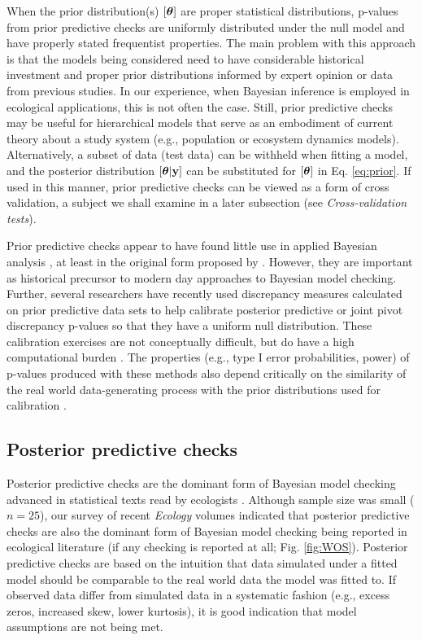 \documentclass[12pt,english]{article}
\begin{document}
\begin{spacing}{1.9}
When the prior distribution(s) $[\boldsymbol{\theta}]$ are proper statistical
distributions, p-values from prior predictive checks are uniformly
distributed under the null model and have properly stated frequentist
properties.  The main problem with this approach is that the models
being considered need to have considerable historical investment and
proper prior distributions informed by expert opinion or data from
previous studies.  In our experience, when Bayesian inference is
employed in ecological applications, this is not often the case.
Still, prior predictive checks may be useful for hierarchical models
that serve as an embodiment of current theory about a study system
(e.g., population or ecosystem dynamics models).  Alternatively, a
subset of data (test data) can be withheld when fitting a model, and
the posterior distribution $[\boldsymbol{\theta}|{\bf y}]$ can be substituted for
$[\boldsymbol{\theta}]$ in Eq. \ref{eq:prior}.  If used in this manner, prior
predictive checks can be viewed as a form of cross validation, a
subject we shall examine in a later subsection (see
\textit{Cross-validation tests}).

Prior predictive checks appear to have found little use in applied
Bayesian analysis \citep[but see][]{DeyEtAl1998}, at least in the
original form proposed by \citet{Box1980}. However, they are important
as historical precursor to modern day approaches to Bayesian model
checking. Further, several researchers have recently used discrepancy
measures calculated on prior predictive data sets to help calibrate
posterior predictive \citep[e.g.,][]{HjortEtAl2006} or joint pivot
discrepancy \citep{Johnson2007} p-values so that they have a uniform
null distribution.  These calibration exercises are not conceptually
difficult, but do have a high computational burden
\citep{YuanJohnson2012}. The properties (e.g., type I error
probabilities, power) of p-values produced with these methods also
depend critically on the similarity of the real world data-generating
process with the prior distributions used for calibration
\citep{Zhang2014}.

\subsection{Posterior predictive checks}

Posterior predictive checks are the dominant form of Bayesian model
checking advanced in statistical texts read by ecologists
\citep[e.g.,][]{KingEtAl2009,LinkBarker2010,KerySchaub2012,GelmanEtAl2014}. Although
sample size was small ($n=25$), our survey of recent \textit{Ecology}
volumes indicated that posterior predictive checks are also the
dominant form of Bayesian model checking being reported in ecological
literature (if any checking is reported at all; Fig. \ref{fig:WOS}).
Posterior predictive checks are based on the intuition that data
simulated under a fitted model should be comparable to the real world
data the model was fitted to. If observed data differ from simulated
data in a systematic fashion (e.g., excess zeros, increased skew,
lower kurtosis), it is good indication that model assumptions are not
being met.


\end{spacing}
\end{document}
